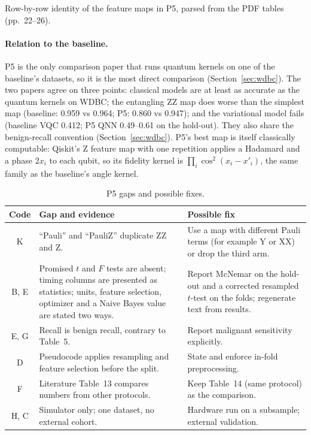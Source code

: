 \documentclass[11pt,a4paper]{article}
\newcommand{\tabdir}{../reimplementation/tex/papers/}
\begin{document}
\begin{table}[H]
\centering\footnotesize
\caption{Row-by-row identity of the feature maps in P5, parsed from the PDF tables (pp.~22--26).}
\label{tab:yadav}

\end{table}

\paragraph{Relation to the baseline.} P5 is the only comparison paper that runs quantum kernels on one of the baseline's datasets, so it is the most direct comparison (Section~\ref{sec:wdbc}). The two papers agree on three points: classical models are at least as accurate as the quantum kernels on WDBC; the entangling ZZ map does worse than the simplest map (baseline: 0.959 vs 0.964; P5: 0.860 vs 0.947); and the variational model fails (baseline VQC 0.412; P5 QNN 0.49--0.61 on the hold-out). They also share the benign-recall convention (Section~\ref{sec:wdbc}). P5's best map is itself classically computable: Qiskit's Z feature map with one repetition applies a Hadamard and a phase $2x_i$ to each qubit, so its fidelity kernel is $\prod_i\cos^2(x_i-x'_i)$, the same family as the baseline's angle kernel.

\begin{table}[H]
\centering\footnotesize
\caption{P5 gaps and possible fixes.}
\begin{tabularx}{\textwidth}{c Y Y}
\toprule
Code & Gap and evidence & Possible fix \\
\midrule
K & ``Pauli'' and ``PauliZ'' duplicate ZZ and Z. & Use a map with different Pauli terms (for example Y or XX) or drop the third arm. \\
B, E & Promised $t$ and $F$ tests are absent; timing columns are presented as statistics; units, feature selection, optimizer and a Naive Bayes value are stated two ways. & Report McNemar on the hold-out and a corrected resampled $t$-test on the folds; regenerate text from results. \\
E, G & Recall is benign recall, contrary to Table~5. & Report malignant sensitivity explicitly. \\
D & Pseudocode applies resampling and feature selection before the split. & State and enforce in-fold preprocessing. \\
F & Literature Table~13 compares numbers from other protocols. & Keep Table~14 (same protocol) as the comparison. \\
H, C & Simulator only; one dataset, no external cohort. & Hardware run on a subsample; external validation. \\
\bottomrule
\end{tabularx}
\end{table}
\end{document}
